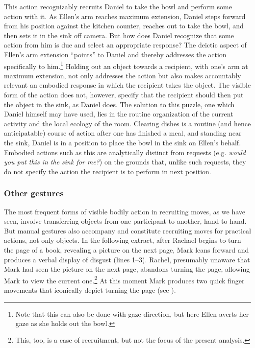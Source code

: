\documentclass[output=paper,nonflat,modfont,draft]{langsci/langscibook}
\begin{document}
This action recognizably recruits Daniel to take the bowl and perform some action with it. As Ellen’s arm reaches maximum extension, Daniel steps forward from his position against the kitchen counter, reaches out to take the bowl, and then sets it in the sink off camera. But how does Daniel recognize that some action from him is due and select an appropriate response? The deictic aspect of Ellen’s arm extension “points” to Daniel and thereby addresses the action specifically to him.\footnote{Note that this can also be done with gaze direction, but here Ellen averts her gaze as she holds out the bowl.} Holding out an object towards a recipient, with one’s arm at maximum extension, not only addresses the action but also makes accountably relevant an embodied response in which the recipient takes the object. The visible form of the action does not, however, specify that the recipient should then put the object in the sink, as Daniel does. The solution to this puzzle, one which Daniel himself may have used, lies in the routine organization of the current activity \citep[see][]{Rossi2014} and the local ecology of the room. Clearing dishes is a routine (and hence anticipatable) course of action after one has finished a meal, and standing near the sink, Daniel is in a position to place the bowl in the sink on Ellen’s behalf. Embodied actions such as this are analytically distinct from requests (e.g. \textit{would you put this in the sink for me?}) on the grounds that, unlike such requests, they do not specify the action the recipient is to perform in next position.

\subsubsection{Other gestures}
The most frequent forms of visible bodily action in recruiting moves, as we have seen, involve transferring objects from one participant to another, hand to hand. But manual gestures also accompany and constitute recruiting moves for practical actions, not only objects. In the following extract, after Rachael begins to turn the page of a book, revealing a picture on the next page, Mark leans forward and produces a verbal display of disgust (lines 1--3). Rachel, presumably unaware that Mark had seen the picture on the next page, abandons turning the page, allowing Mark to view the current one.\footnote{This, too, is a case of recruitment, but not the focus of the present analysis.} At this moment Mark produces two quick finger movements that iconically depict turning the page (see ).
\end{document}

